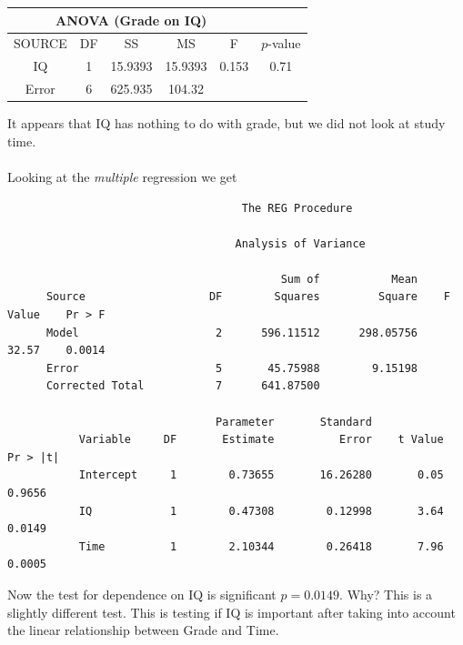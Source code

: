 \begin{center}
\begin{tabular}{|c|c|c|c|c|c|}
\multicolumn{5}{c}{ANOVA (Grade on IQ)} \\ \hline
SOURCE   & DF   & SS   & MS   & F & $p$-value\\ \hline
IQ   & 1   & 15.9393   & 15.9393   & 0.153 & 0.71\\
Error   & 6   & 625.935  & 104.32  & & \\  \hline
\end{tabular}
\end{center}

\noindent
It appears that IQ has nothing to do with grade, but we did not look at study time. \\~\\
Looking at the {\itshape multiple} regression we get \\

\begin{small}
\begin{verbatim}
                                    The REG Procedure

                                   Analysis of Variance
 
                                          Sum of           Mean
      Source                   DF        Squares         Square    F Value    Pr > F
      Model                     2      596.11512      298.05756      32.57    0.0014
      Error                     5       45.75988        9.15198                     
      Corrected Total           7      641.87500                                    

                                Parameter       Standard
           Variable     DF       Estimate          Error    t Value    Pr > |t|
           Intercept     1        0.73655       16.26280       0.05      0.9656
           IQ            1        0.47308        0.12998       3.64      0.0149
           Time          1        2.10344        0.26418       7.96      0.0005
\end{verbatim}
\end{small}
Now the test for dependence on IQ is significant $p=0.0149$.  Why?  This is a slightly different test.  This is testing if IQ is important after taking into account the linear relationship between Grade and Time.\\~\\

